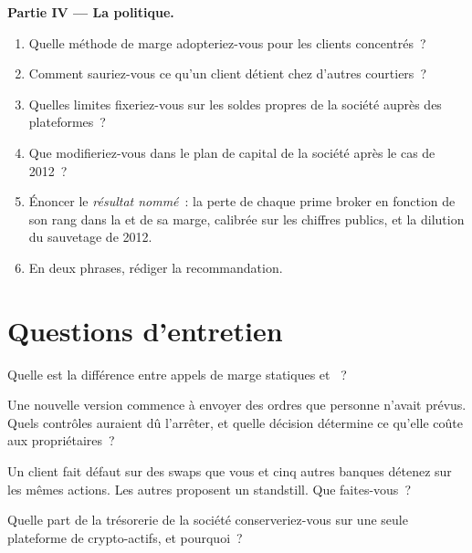 \begin{problem}
\medskip\noindent\textbf{Partie IV --- La politique.}
\begin{enumerate}[resume]
\item Quelle méthode de marge adopteriez-vous pour les clients concentrés~?
\item Comment sauriez-vous ce qu'un client détient chez d'autres courtiers~?
\item Quelles limites fixeriez-vous sur les soldes propres de la société auprès des plateformes~?
\item Que modifieriez-vous dans le plan de capital de la société après le cas de 2012~?
\item Énoncer le \emph{résultat nommé}~: la perte de chaque prime broker en fonction de son rang dans la  et de sa marge, calibrée sur les chiffres publics,
et la dilution du sauvetage de 2012.
\item En deux phrases, rédiger la recommandation.
\end{enumerate}
\end{problem}

\section{Questions d'entretien}

\begin{interviewq}\label{iq:fm:case-studies-ii:1}
Quelle est la différence entre appels de marge statiques et ~?
\end{interviewq}

\begin{interviewq}\label{iq:fm:case-studies-ii:2}
Une nouvelle version commence à envoyer des ordres que personne n'avait prévus. Quels contrôles auraient dû l'arrêter, et quelle décision détermine ce qu'elle coûte aux propriétaires~?
\end{interviewq}

\begin{interviewq}\label{iq:fm:case-studies-ii:3}
Un client fait défaut sur des swaps que vous et cinq autres banques détenez sur les mêmes actions. Les autres proposent un standstill. Que faites-vous~?
\end{interviewq}

\begin{interviewq}\label{iq:fm:case-studies-ii:4}
Quelle part de la trésorerie de la société conserveriez-vous sur une seule plateforme de crypto-actifs, et pourquoi~?
\end{interviewq}

